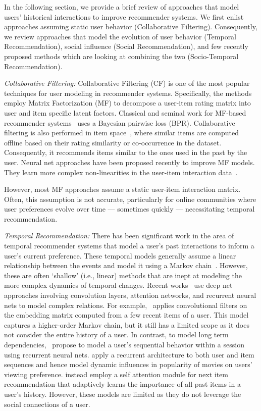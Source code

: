 In the following section, we provide a brief review of approaches that model users' historical interactions to improve recommender systems. We first enlist approaches assuming static user behavior (Collaborative Filtering). Consequently, we review approaches that model the evolution of user behavior (Temporal Recommendation), social influence (Social Recommendation), and few recently proposed methods which are looking at combining the two (Socio-Temporal Recommendation).

\noindent
\emph{Collaborative Filtering:}
Collaborative Filtering (CF) is one of the most popular techniques for user modeling in recommender systems.
Specifically, the methods employ Matrix Factorization (MF) to decompose a user-item rating matrix into user and item specific latent factors.
Classical and seminal work for MF-based recommender systems~\cite{Rendle} uses a Bayesian pairwise loss (BPR). Collaborative filtering is also performed in item space~\cite{itemCF}, where similar items are computed offline based on their rating similarity or co-occurrence in the dataset. Consequently, it recommends items similar to the ones used in the past by the user.
Neural net approaches have been proposed recently to improve MF models. They learn more complex non-linearities in the user-item interaction data~\cite{NeuMF, CDAE}.

However, most MF approaches assume a static user-item interaction matrix. Often, this assumption is not accurate, particularly for online communities where user preferences evolve over time --- sometimes quickly --- necessitating temporal recommendation.

\noindent
\emph{Temporal Recommendation:}
There has been significant work in the area of temporal recommender systems that model a user's past interactions to inform a user's current preference. These temporal models generally assume a linear relationship between the events and model it using a Markov chain~\cite{FPMC, Rendle2}. However, these are often `shallow' (i.e., linear) methods that are inept at modeling the more complex dynamics of temporal changes. Recent works~\cite{Sun:2018, Cai:2017, SAS:2018} use deep net approaches involving convolution layers, attention networks, and recurrent neural nets to model complex relations. For example,~\citet{Caser} applies convolutional filters on the embedding matrix computed from a few recent items of a user. This model captures a higher-order Markov chain, but it still has a limited scope as it does not consider the entire history of a user.
In contrast, to model long term dependencies,~\citet{GRU4Rec} propose to model a user's sequential behavior within a session using recurrent neural nets. \citet{RRN} apply a recurrent architecture to both user and item sequences and hence model dynamic influences in popularity of movies on users' viewing preference. \citet{SAS:2018} instead employ a self attention module for next item recommendation that adaptively learns the importance of all past items in a user's history. However, these models are limited as they do not leverage the social connections of a user.

